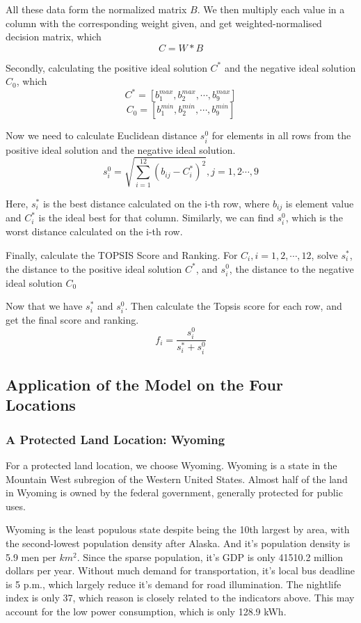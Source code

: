 All these data form the normalized matrix $B$. We then multiply each value in a column with the corresponding weight given, and get weighted-normalised decision matrix, which $$C=W*B$$

Secondly, calculating the positive ideal solution $C^*$ and the negative ideal solution $C_0$, which$$C^*=[b_1^{max},b_2^{max},\cdots,b_9^{max}]$$ $$C_0=[b_1^{min},b_2^{min},\cdots,b_9^{min}]$$

Now we need to calculate Euclidean distance $s_i^{0}$ for elements in all rows from the positive ideal solution and the negative ideal solution.$$s_i^{0}=\sqrt{\sum_{i=1}^{12}(b_{ij}-C_i^{*})^{2}},j=1,2\cdots,9$$

Here, $s_i^*$ is the best distance calculated on the i-th row, where $b_{ij}$ is element value and $C_i^{*}$ is the ideal best for that column. Similarly, we can find $s_i^0$, which is the worst distance calculated on the i-th row.

Finally, calculate the TOPSIS Score and Ranking. For $C_i,i=1,2,\cdots,12$, solve $s_i^*$, the distance to the positive ideal solution $C^*$, and $s_i^0$, the distance to the negative ideal solution $C_0$

Now that we have $s_i^*$ and $s_i^0$. Then calculate the Topsis score for each row, and get the final score and ranking. $$f_i=\frac{s_i^0}{s_i^*+s_i^0}$$

\subsection{Application of the Model on the Four Locations}


\subsubsection{A Protected Land Location: Wyoming}
For a protected land location, we choose Wyoming. Wyoming is a state in the Mountain West subregion of the Western United States. Almost half of the land in Wyoming is owned by the federal government, generally protected for public uses.

Wyoming is the least populous state despite being the 10th largest by area, with the second-lowest population density after Alaska. And it's population density is 5.9 men per $km^2$. Since the sparse population, it's GDP is only 41510.2 million dollars per year. Without much demand for transportation, it's local bus deadline is 5 p.m., which largely reduce it's demand for road illumination. The nightlife index is only 37, which reason is closely related to the indicators above. This may account for the low power consumption, which is only 128.9 kWh. 

